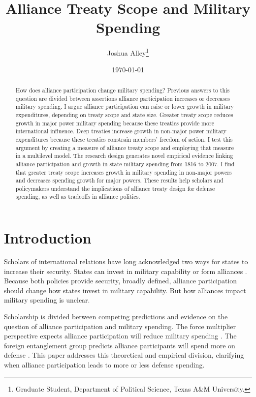 \documentclass[12pt]{article}
\title{\textbf{Alliance Treaty Scope and Military Spending}}
\author{Joshua Alley\footnote{Graduate Student,
Department of Political Science, Texas A\&M University.}}
\date{{\normalsize \today}}
\begin{document}
\maketitle 

\newpage 

\doublespace 

\begin{abstract}
How does alliance participation change military spending? 
Previous answers to this question are divided between assertions alliance participation increases or decreases military spending. 
I argue alliance participation can raise or lower growth in military expenditures, depending on treaty scope and state size. 
Greater treaty scope reduces growth in major power military spending because these treaties provide more international influence. 
Deep treaties increase growth in non-major power military expenditures because these treaties constrain members' freedom of action. 
I test this argument by creating a measure of alliance treaty scope and employing that measure in a multilevel model. 
The research design generates novel empirical evidence linking alliance participation and growth in state military spending from 1816 to 2007. 
I find that greater treaty scope increases growth in military spending in non-major powers and decreases spending growth for major powers.  
These results help scholars and policymakers understand the implications of alliance treaty design for defense spending, as well as tradeoffs in alliance politics. 
\end{abstract}



\section{Introduction}


Scholars of international relations have long acknowledged two ways for states to increase their security. 
States can invest in military capability or form alliances \citep{Morgenthau1948}.
Because both policies provide security, broadly defined, alliance participation should change how states invest in military capability. 
But how alliances impact military spending is unclear. 


Scholarship is divided between competing predictions and evidence on the question of alliance participation and military spending. 
The force multiplier perspective expects alliance participation will reduce military spending \citep{Morrow1993, Conybeare1994, DigiuseppePoast2016}. 
The foreign entanglement group predicts alliance participants will spend more on defense \citep{Diehl1994, MorganPalmer2006}. 
This paper addresses this theoretical and empirical division, clarifying when alliance participation leads to more or less defense spending. 
\end{document}
